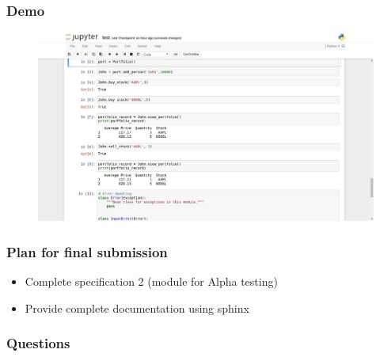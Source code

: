 \documentclass[serif,mathserif]{beamer}
\begin{document}
  \begin{frame}
    \frametitle{Demo}
    \begin{figure}[h]
      \centering
      \includegraphics[width=\linewidth]{demo.png}
    \end{figure}
  \end{frame}

  \begin{frame}
    \frametitle{Plan for final submission}
    \begin{itemize}
      \item Complete specification 2 (module for Alpha testing)
      \item Provide complete documentation using sphinx
    \end{itemize}
  \end{frame}

  \begin{frame}
    \frametitle{Questions}
  \end{frame}
\end{document}
